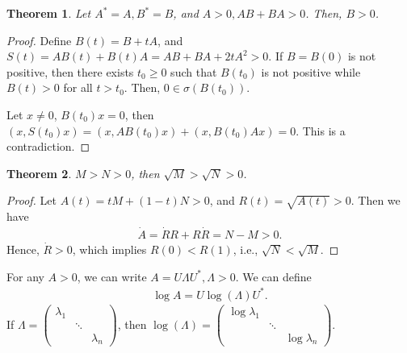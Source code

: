 \documentclass[11pt]{book}
\newtheorem{theorem}{Theorem}[section]
\theoremstyle{definition}
\numberwithin{equation}{chapter}
\begin{document}
\begin{theorem}
Let $A^* = A, B^* = B$, and $A > 0, AB + BA > 0$. Then, $B > 0$.
\end{theorem}
\begin{proof}
Define $B(t) = B + tA$, and $S(t) = AB(t) + B(t)A = AB + BA + 2t A^2 > 0$. If $B = B(0)$ is not positive, then there exists $t_0 \geq 0$ such that $B(t_0)$ is not positive while $B(t) > 0$ for all $t > t_0$. Then, $0 \in \sigma(B(t_0))$. 

Let $x \neq 0$, $B(t_0)x = 0$, then $(x, S(t_0)x) = (x, AB(t_0)x) + (x, B(t_0)Ax) = 0$. This is a contradiction.
\end{proof}

\medskip

\begin{theorem}
$M > N > 0$, then $\sqrt{M} > \sqrt{N} > 0$.
\end{theorem}
\begin{proof}
Let $A(t) = tM + (1-t)N > 0$, and $R(t) = \sqrt{A(t)} > 0$. Then we have 
\begin{align*}
    \dot{A} = \dot{R}R + R \dot{R} = N - M > 0.
\end{align*}
Hence, $\dot{R} > 0$, which implies $R(0) < R(1)$, i.e., $\sqrt{N} < \sqrt{M}$.
\end{proof}

\medskip

For any $A > 0$, we can write $A = U \Lambda U^*, \Lambda > 0$. We can define 
\begin{align*}
    \log A = U \log (\Lambda) U^*.
\end{align*}
If $\Lambda = \begin{pmatrix}
\lambda_1 &  &  \\
& \ddots &  \\
&  & \lambda_n
\end{pmatrix}$, then $\log (\Lambda) = \begin{pmatrix}
 \log \lambda_1 &  &  \\
& \ddots &  \\
&  & \log \lambda_n
\end{pmatrix}$.

\medskip
\end{document}
